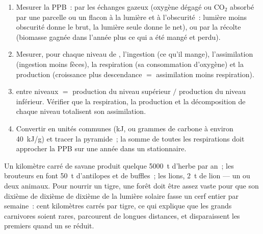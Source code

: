 \begin{method}\label{met:b1:ecosystem-organization:budget}
\begin{enumerate}
  \item Mesurer la PPB~: par les échanges gazeux (oxygène dégagé ou
        $\mathrm{CO_2}$ absorbé par une parcelle ou un flacon à la
        lumière et à l'obscurité~: lumière moins obscurité donne le
        brut, la lumière seule donne le net), ou par la récolte
        (biomasse gagnée dans l'année plus ce qui a été mangé et perdu).
  \item Mesurer, pour chaque niveau de , l'ingestion (ce
        qu'il mange), l'assimilation (ingestion moins fèces), la
        respiration (sa consommation d'oxygène) et la production
        (croissance plus descendance $=$ assimilation moins
        respiration).
  \item {} entre niveaux $=$ production du niveau
        supérieur $/$ production du niveau inférieur. Vérifier que la
        respiration, la production et la décomposition de chaque niveau
        totalisent son assimilation.
  \item Convertir en unités communes (\unit{kJ}, ou grammes de carbone
        à environ \qty{40}{kJ/g}) et tracer la pyramide~; la somme de
        toutes les respirations doit approcher la PPB sur une année
        dans un  stationnaire.
\end{enumerate}
\end{method}

\begin{example}\label{ex:b1:ecosystem-organization:top}
Un kilomètre carré de savane produit quelque \qty{5000}{t} d'herbe par
an~; les brouteurs en font \qty{50}{t} d'antilopes et de buffles~; les
lions, \qty{2}{t} de lion --- un ou deux animaux. Pour nourrir un tigre,
une forêt doit être assez vaste pour que son dixième de dixième de
dixième de la lumière solaire fasse un cerf entier par semaine~: cent
kilomètres carrés par tigre, ce qui explique que les grands carnivores
soient rares, parcourent de longues distances, et disparaissent les
premiers quand un  se réduit.
\end{example}

